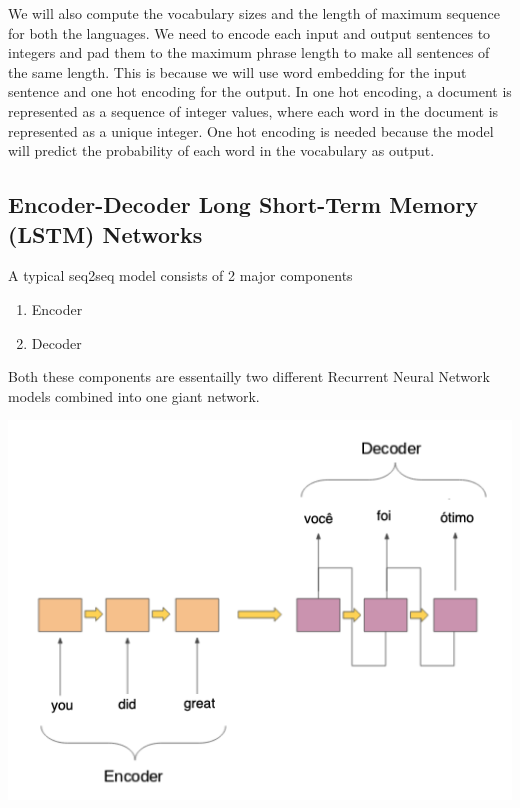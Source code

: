\documentclass[runningheads]{llncs}
\begin{document}
	We will also compute the vocabulary sizes and the length of maximum sequence for both the languages. We need to encode each input and output sentences to integers and  pad them to the maximum phrase length to make all sentences of the same length. This is because we will use word embedding for the input sentence and one hot encoding for the output. In one hot encoding, a document is represented as a sequence of integer values, where each word in the document is represented as a unique integer. One hot encoding is needed because the model will predict the probability of each word in the vocabulary as output.
	

	
	\subsection{Encoder-Decoder Long Short-Term Memory (LSTM) Networks}	
	A typical seq2seq model consists of 2 major components
	\begin{enumerate}
		\item Encoder
		\item Decoder
	\end{enumerate}
	
	Both these components are essentailly two different Recurrent Neural Network models combined into one giant network.
	
	\begin{minipage}{\linewidth}
		\begin{center}
			\includegraphics[width=\linewidth]{enc_dec_2.png}
			\label{fig:Sequence to Sequence Model}~\cite{ref_url4}
		\end{center}
	\end{minipage}
	\afterpage{\clearpage}
	
\end{document}
